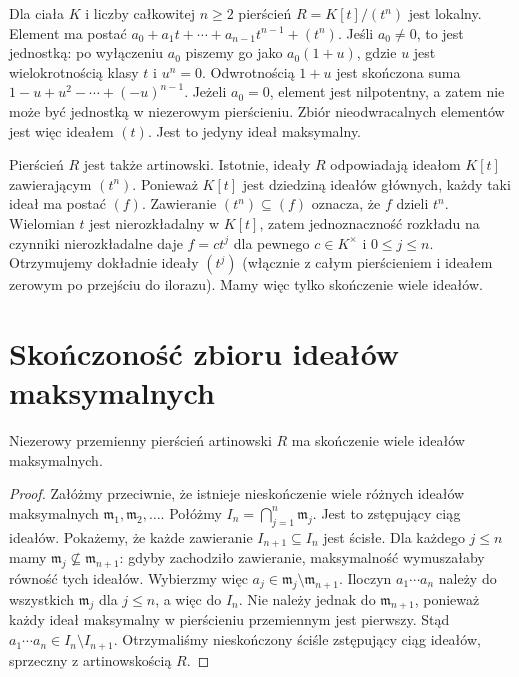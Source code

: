 \begin{przyklad}
\label{aa:prz:local-artin-examples}
Dla ciała $K$ i liczby całkowitej $n\ge2$ pierścień
$R=K[t]/(t^n)$ jest lokalny. Element ma postać
$a_0+a_1t+\cdots+a_{n-1}t^{n-1}+(t^n)$.
Jeśli $a_0\ne0$, to jest jednostką:
po wyłączeniu $a_0$ piszemy go jako $a_0(1+u)$,
gdzie $u$ jest wielokrotnością klasy $t$ i $u^n=0$.
Odwrotnością $1+u$ jest skończona suma
$1-u+u^2-\cdots+(-u)^{n-1}$. Jeżeli $a_0=0$,
element jest nilpotentny, a zatem nie może być
jednostką w niezerowym pierścieniu. Zbiór
nieodwracalnych elementów jest więc ideałem $(t)$.
Jest to jedyny ideał maksymalny.

Pierścień $R$ jest także artinowski. Istotnie,
ideały $R$ odpowiadają ideałom $K[t]$ zawierającym
$(t^n)$. Ponieważ $K[t]$ jest dziedziną ideałów
głównych, każdy taki ideał ma postać $(f)$.
Zawieranie $(t^n)\subseteq(f)$ oznacza, że
$f$ dzieli $t^n$. Wielomian $t$ jest nierozkładalny
w $K[t]$, zatem jednoznaczność rozkładu na czynniki
nierozkładalne daje $f=ct^j$ dla pewnego $c\in K^\times$
i $0\le j\le n$. Otrzymujemy dokładnie ideały
$(t^j)$ (włącznie z całym pierścieniem i ideałem
zerowym po przejściu do ilorazu).
Mamy więc tylko skończenie wiele ideałów.
\end{przyklad}

\section{Skończoność zbioru ideałów maksymalnych}
\begin{twierdzenie}
\label{aa:tw:artin-finite-maximals}
Niezerowy przemienny pierścień artinowski $R$ ma
skończenie wiele ideałów maksymalnych.
\end{twierdzenie}
\begin{proof}
Załóżmy przeciwnie, że istnieje nieskończenie wiele
różnych ideałów maksymalnych
$\mathfrak m_1,\mathfrak m_2,\ldots$.
Połóżmy $I_n=\bigcap_{j=1}^n\mathfrak m_j$.
Jest to zstępujący ciąg ideałów. Pokażemy, że każde
zawieranie $I_{n+1}\subseteq I_n$ jest ścisłe.
Dla każdego $j\le n$ mamy
$\mathfrak m_j\not\subseteq\mathfrak m_{n+1}$:
gdyby zachodziło zawieranie, maksymalność wymuszałaby
równość tych ideałów. Wybierzmy więc
$a_j\in\mathfrak m_j\setminus\mathfrak m_{n+1}$.
Iloczyn $a_1\cdots a_n$ należy do wszystkich
$\mathfrak m_j$ dla $j\le n$, a więc do $I_n$.
Nie należy jednak do $\mathfrak m_{n+1}$, ponieważ
każdy ideał maksymalny w pierścieniu przemiennym
jest pierwszy. Stąd
$a_1\cdots a_n\in I_n\setminus I_{n+1}$.
Otrzymaliśmy nieskończony ściśle zstępujący ciąg
ideałów, sprzeczny z artinowskością $R$.
\end{proof}

